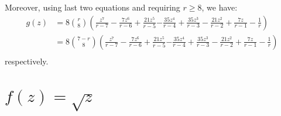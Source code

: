 Moreover, using last two equations and requiring $r \geq 8$, we have:
\begin{displaymath}
\begin{split}
g{\left (z \right )} &= 8 {\binom{r}{8}} \left( \frac{z^{7}}{r - 7} - \frac{7 z^{6}}{r - 6} + \frac{21 z^{5}}{r - 5}\right. \left. - \frac{35 z^{4}}{r - 4} + \frac{35 z^{3}}{r - 3} - \frac{21 z^{2}}{r - 2} + \frac{7 z}{r - 1} - \frac{1}{r} \right) \\
&= 8 {\binom{7-r}{8}} \left( \frac{z^{7}}{r - 7} - \frac{7 z^{6}}{r - 6} + \frac{21 z^{5}}{r - 5}\right. \left. - \frac{35 z^{4}}{r - 4} + \frac{35 z^{3}}{r - 3} - \frac{21 z^{2}}{r - 2} + \frac{7 z}{r - 1} - \frac{1}{r} \right) \\
\end{split}
\end{displaymath}
respectively.


\section{$f(z)=\sqrt{z}$}

